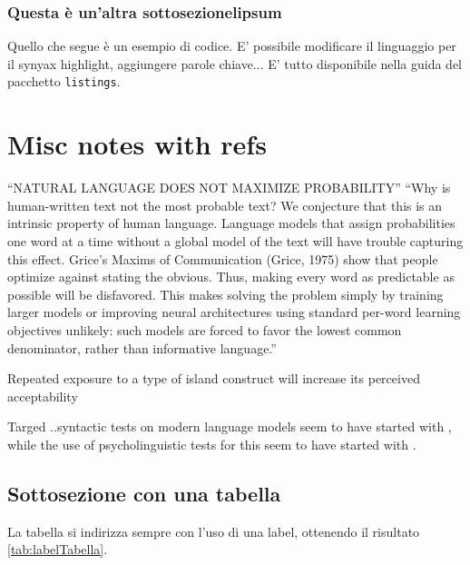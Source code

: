 \subsubsection{Questa è un'altra sottosezionelipsum}

Quello che segue è un esempio di codice. E' possibile modificare il linguaggio per il synyax highlight, aggiungere parole chiave... E' tutto disponibile nella guida del pacchetto \texttt{listings}.

 

\section{Misc notes with refs}

“NATURAL LANGUAGE DOES NOT MAXIMIZE PROBABILITY” 
“Why is human-written text not the most probable text? We conjecture that this is an intrinsic property of human language. Language models that assign probabilities one word at a time without a global model of the text will have trouble capturing this effect. Grice’s Maxims of Communication (Grice, 1975) show that people optimize against stating the obvious. Thus, making every word as predictable as possible will be disfavored. This makes solving the problem simply by training larger models or improving neural architectures using standard per-word learning objectives unlikely: such models are forced to favor the lowest common denominator, rather than informative language.” 
\citep{holtzman2019curious}

Repeated exposure to a type of island construct will increase its perceived acceptability 
\citep{chaves2014subject}

Targed ..syntactic tests on modern language models seem to have started with \citet{linzen2016assessing}, while the use of psycholinguistic tests for this seem to have started with \citet{futrell2018rnns}.

\subsection{Sottosezione con una tabella}

La tabella si indirizza sempre con l'uso di una label, ottenendo il risultato \autoref{tab:labelTabella}.

